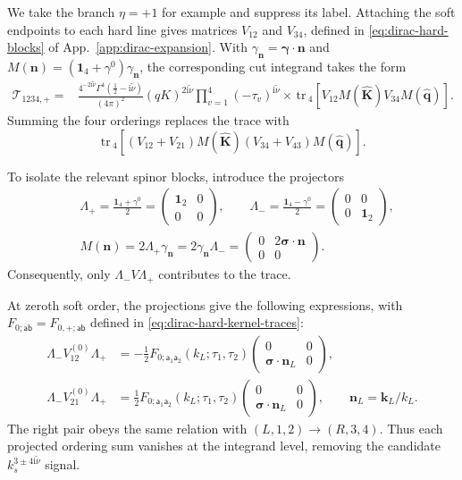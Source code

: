 \documentclass[a4paper,12pt]{article}
\def\mb{\mathbf}
\def\tr{\mathrm{\,tr\,}}
\def\to{\rightarrow}
\def\ii{\mathrm{i}}
\def\tn{\tilde\nu}
\def\aa{\mathsf{a}}
\def\bb{\mathsf{b}}
\begin{document}
We take the branch $\eta=+1$ for example and suppress its label.
Attaching the soft endpoints to each hard line gives matrices $V_{12}$ and $V_{34}$, defined in \eqref{eq:dirac-hard-blocks} of App.~\ref{app:dirac-expansion}.
With $\gamma_{\mb n}=\bm\gamma\cdot\mb n$ and $M(\mb n)=(\mathbf1_4+\gamma^0)\gamma_{\mb n}$, the corresponding cut integrand takes the form
\begin{align}
 \mathcal T^{\mathrm{}}_{1234,+}
 ={}&\frac{4^{-2\ii\tn}\Gamma^4(\tfrac12-\ii\tn)}{(4\pi)^2}
 (qK)^{2\ii\tn}\prod_{v=1}^4(-\tau_v)^{\ii\tn}
 \times\tr_4[V_{12}M(\widehat{\mb K})
                  V_{34}M(\widehat{\mb q})].
 \label{eq:dirac-cut-trace}
\end{align}
Summing the four orderings replaces the trace with
\begin{equation}
 \tr_4[(V_{12}+V_{21})M(\widehat{\mb K})
       (V_{34}+V_{43})M(\widehat{\mb q})].
 \label{eq:dirac-four-orderings}
\end{equation}

To isolate the relevant spinor blocks, introduce the projectors
\begin{equation}
 \begin{aligned}
 &\Lambda_+=\frac{\mathbf1_4+\gamma^0}{2}
 =\begin{pmatrix}\mathbf1_2&0\\0&0\end{pmatrix},\qquad
 \Lambda_-=\frac{\mathbf1_4-\gamma^0}{2}
 =\begin{pmatrix}0&0\\0&\mathbf1_2\end{pmatrix},\\[2mm]
 &M(\mb n)=2\Lambda_+\gamma_{\mb n}
          =2\gamma_{\mb n}\Lambda_-
          =\begin{pmatrix}0&2\bm\sigma\cdot\mb n\\0&0\end{pmatrix}.
 \end{aligned}
 \label{eq:dirac-soft-projectors}
\end{equation}
Consequently, only $\Lambda_-V\Lambda_+$ contributes to the trace.

At zeroth soft order, the projections give the following expressions, with $F_{0;\aa\bb}=F_{0,+;\aa\bb}$ defined in \eqref{eq:dirac-hard-kernel-traces}:
\begin{align}
 \Lambda_-V_{12}^{(0)}\Lambda_+
 &=-\frac12F_{0;\aa_1\aa_2}(k_L;\tau_1,\tau_2)
       \begin{pmatrix}0&0\\\bm\sigma\cdot\mb n_L&0\end{pmatrix},
 \nonumber\\
 \Lambda_-V_{21}^{(0)}\Lambda_+
 &=\frac12F_{0;\aa_1\aa_2}(k_L;\tau_1,\tau_2)
       \begin{pmatrix}0&0\\\bm\sigma\cdot\mb n_L&0\end{pmatrix},
 \qquad \mb n_L=\mb k_L/k_L.
 \label{eq:dirac-cancellation}
\end{align}
The right pair obeys the same relation with $(L,1,2)\to(R,3,4)$.
Thus each projected ordering sum vanishes at the integrand level, removing the candidate $k_s^{3\pm4\ii\tn}$ signal.
\end{document}
